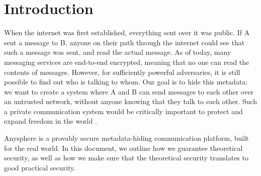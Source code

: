 \section{Introduction}

When the internet was first established, everything sent over it was public. If A sent a message to B, anyone on their path through the internet could see that such a message was sent, and read the actual message. As of today, many messaging services are end-to-end encrypted, meaning that no one can read the contents of messages. However, for sufficiently powerful adversaries, it is still possible to find out who is talking to whom. Our goal is to hide this metadata: we want to create a system where A and B can send messages to each other over an untrusted network, without anyone knowing that they talk to each other. Such a private communication system would be critically important to protect and expand freedom in the world \cite{arvid}.

Anysphere is a provably secure metadata-hiding communication platform, built for the real world. In this document, we outline how we guarantee theoretical security, as well as how we make sure that the theoretical security translates to good practical security.

